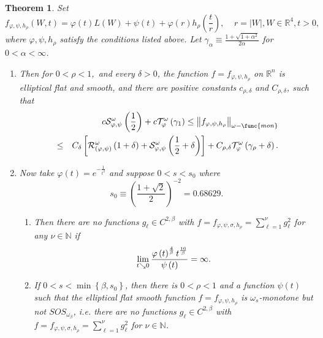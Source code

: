 \documentclass{amsart}
\newtheorem{theorem}{Theorem}[section]
\theoremstyle{plain}
\numberwithin{equation}{section}
\begin{document}
\begin{theorem}
\label{1/4 and epsilon_0}Set 
\begin{equation*}
f_{\varphi ,\psi ,h_{\rho }}\left( W,t\right) =\varphi \left( t\right)
L\left( W\right) +\psi \left( t\right) +\varphi \left( r\right) h_{\rho
}\left( \frac{t}{r}\right) ,\ \ \ \ \ r=\left\vert W\right\vert ,W\in 
\mathbb{R}^{4},t>0,
\end{equation*}%
where $\varphi ,\psi ,h_{\rho }$ satisfy the conditions listed above. Let $%
\gamma _{\alpha }\equiv \frac{1+\sqrt{1+\alpha ^{2}}}{2\alpha }$ for $%
0<\alpha <\infty $.

\begin{enumerate}
\item Then for $0<\rho <1$,\ and every $\delta >0$, the function $%
f=f_{\varphi ,\psi ,h_{\rho }}$ on $\mathbb{R}^{n}$ is elliptical flat and
smooth, and there are positive constants $c_{\rho ,\delta }$ and $C_{\rho
,\delta }$, such that\emph{\ }%
\begin{eqnarray}
&&c\mathcal{S}_{\varphi ,\psi }^{\omega }\left( \frac{1}{2}\right) +c%
\mathcal{T}_{\varphi }^{\omega }\left( \gamma _{1}\right) \leq \left\Vert
f_{\varphi ,\psi ,h_{\rho }}\right\Vert _{\omega -\func{mon}}
\label{mon equiv} \\
&\leq &C_{\delta }\left[ \mathcal{R}_{\left( \varphi ,\psi \right) }^{\omega
}\left( 1+\delta \right) +\mathcal{S}_{\varphi ,\psi }^{\omega }\left( \frac{%
1}{2}+\delta \right) \right] +C_{\rho ,\delta }\mathcal{T}_{\varphi
}^{\omega }\left( \gamma _{\rho }+\delta \right) .  \notag
\end{eqnarray}

\item Now take $\varphi \left( t\right) =e^{-\frac{1}{t^{2}}}$ and suppose $%
0<s<s_{0}$ where%
\begin{equation}
s_{0}\equiv \left( \frac{1+\sqrt{2}}{2}\right) ^{-2}=0.68629.  \label{thresh}
\end{equation}

\begin{enumerate}
\item Then there are no functions $g_{\ell }\in C^{2,\beta }$ with $%
f=f_{\varphi ,\psi ,\sigma ,h_{\rho }}=\sum_{\ell =1}^{\nu }g_{\ell }^{2}$
for any $\nu \in \mathbb{N}$ if%
\begin{equation*}
\lim_{t\searrow 0}\frac{\varphi \left( t\right) ^{\frac{4}{\beta }}t^{\frac{%
16}{\beta }}}{\psi \left( t\right) }=\infty .
\end{equation*}

\item If $0<s<\min \left\{ \beta ,s_{0}\right\} $, then there is $0<\rho <1$
and a function $\psi \left( t\right) $ such that the elliptical flat smooth
function $f=f_{\varphi ,\psi ,h_{\rho }}$ is $\omega _{s}$-monotone but not $%
SOS_{\omega _{\beta }}$, i.e. there are no functions $g_{\ell }\in
C^{2,\beta }$ with $f=f_{\varphi ,\psi ,\sigma ,h_{\rho }}=\sum_{\ell
=1}^{\nu }g_{\ell }^{2}$ for $\nu \in \mathbb{N}$.
\end{enumerate}
\end{enumerate}
\end{theorem}
\end{document}
